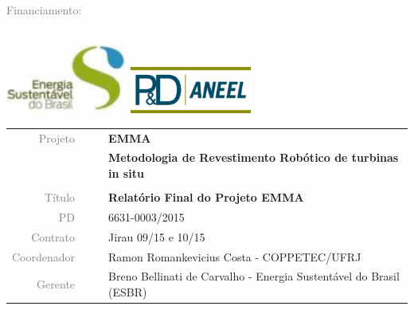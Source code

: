 \vspace{2cm}

\textcolor{gray}{Financiamento: } \\ 
\\
\begin{minipage}{\textwidth}
	\centering
	
	\includegraphics[width=0.3\textwidth]{logo/esbr-logo}
	\includegraphics[width=0.3\textwidth]{logo/aneel-logo}

	
\end{minipage}

\vspace{4cm}

\begin{table}[ht!]
	\centering
	\begin{tabular}{r l|l p{18cm} }
		\textcolor{gray}{Projeto} &&& \textbf{\Large EMMA}\\
			&&& \textbf{Metodologia de Revestimento Robótico de turbinas in situ}\\
			&&& \\
		\textcolor{gray}{Título} &&& \textbf{Relatório Final do Projeto EMMA}\\
		\textcolor{gray}{PD} &&& 6631-0003/2015 \\
		\textcolor{gray}{Contrato} &&& Jirau 09/15 e 10/15\\
		\textcolor{gray}{Coordenador} &&& Ramon Romankevicius Costa - COPPETEC/UFRJ \\
		\textcolor{gray}{Gerente} &&& Breno Bellinati de Carvalho - Energia
		Sustentável do Brasil (ESBR)\\
	\end{tabular}
\end{table}


\cleardoublepage



